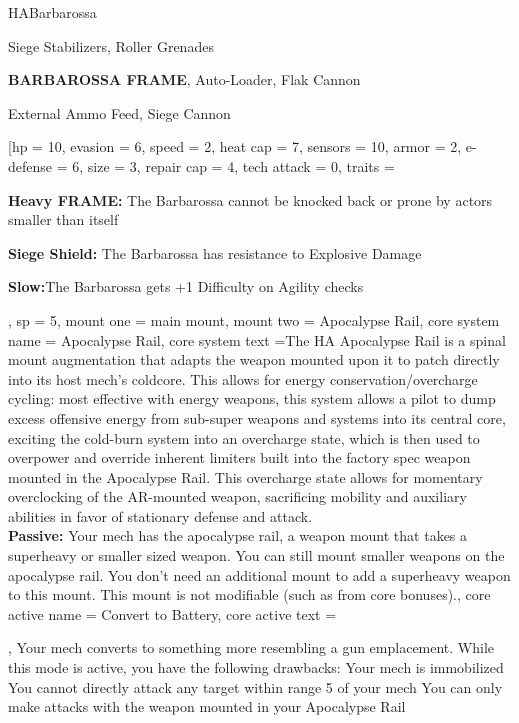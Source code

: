 \begin{mech}{HA}{Barbarossa}


\begin{license}
\item Siege Stabilizers, Roller Grenades
\item \textbf{BARBAROSSA FRAME}, Auto-Loader, Flak Cannon
\item External Ammo Feed, Siege Cannon
\end{license}

\frameBox
[hp = 10,
evasion = 6,
speed = 2,
heat cap = 7,
sensors = 10,
armor = 2,
e-defense = 6,
size = 3,
repair cap = 4,
tech attack = 0,
traits = {\textbf{Heavy FRAME:} The Barbarossa cannot be knocked back or prone by actors smaller than itself

\textbf{Siege Shield:} The Barbarossa has resistance to Explosive Damage

\textbf{Slow:}The Barbarossa gets +1 Difficulty on Agility checks},
sp = 5,
mount one = main mount,
mount two = Apocalypse Rail,
core system name = Apocalypse Rail,
core system text ={The HA Apocalypse Rail is a spinal mount augmentation that adapts the weapon mounted upon it to patch directly into its host mech's coldcore. This allows for energy conservation/overcharge cycling: most effective with energy weapons, this system allows a pilot to dump excess offensive energy from sub-super weapons and systems into its central core, exciting the cold-burn system into an overcharge state, which is then used to overpower and override inherent limiters built into the factory spec weapon mounted in the Apocalypse Rail. This overcharge state allows for momentary overclocking of the AR-mounted weapon, sacrificing mobility and auxiliary abilities in favor of stationary defense and attack.\\
\textbf{Passive:} Your mech has the apocalypse rail, a weapon mount that takes a superheavy or smaller sized weapon. You can still mount smaller weapons on the apocalypse rail. You don't need an additional mount to add a superheavy weapon to this mount. This mount is not modifiable (such as from core bonuses).},
core active name = Convert to Battery,
core active text ={\QuickAction,
Your mech converts to something more resembling a gun emplacement. While this mode is active, you have the following drawbacks:
    Your mech is immobilized
    You cannot directly attack any target within range 5 of your mech
    You can only make attacks with the weapon mounted in your Apocalypse Rail

}
\end{mech}

